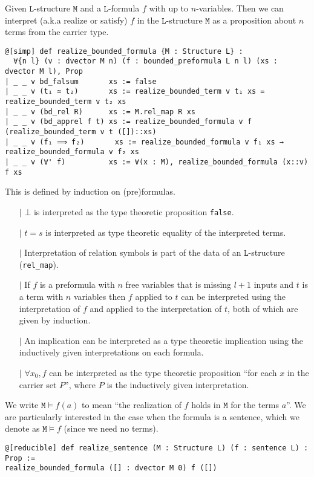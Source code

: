 \begin{dfn}

    Given $\texttt{L}$-structure $\texttt{M}$ and a $\texttt{L}$-formula $f$ with up to $n$-variables.
    Then we can interpret (a.k.a realize or satisfy) $f$ in the $\texttt{L}$-structure $\texttt{M}$ as a
    proposition about $n$ terms from the carrier type.

    \begin{lstlisting}
@[simp] def realize_bounded_formula {M : Structure L} :
  ∀{n l} (v : dvector M n) (f : bounded_preformula L n l) (xs : dvector M l), Prop
| _ _ v bd_falsum       xs := false
| _ _ v (t₁ ≃ t₂)       xs := realize_bounded_term v t₁ xs = realize_bounded_term v t₂ xs
| _ _ v (bd_rel R)      xs := M.rel_map R xs
| _ _ v (bd_apprel f t) xs := realize_bounded_formula v f (realize_bounded_term v t ([])::xs)
| _ _ v (f₁ ⟹ f₂)       xs := realize_bounded_formula v f₁ xs → realize_bounded_formula v f₂ xs
| _ _ v (∀' f)          xs := ∀(x : M), realize_bounded_formula (x::v) f xs \end{lstlisting}

  This is defined by induction on (pre)formulas.
  \begin{itemize}
    \item[$\vert$] $\bot$ is interpreted as the type theoretic proposition \texttt{false}.
    \item[$\vert$] $t = s$ is interpreted as type theoretic equality of the interpreted terms.
    \item[$\vert$] Interpretation of relation symbols is part of the data of an
          $\texttt{L}$-structure (\texttt{rel\_map}).
    \item[$\vert$] If $f$ is a preformula with $n$ free variables that is missing
          $l + 1$ inputs and $t$ is a term with $n$ variables
          then $f$ applied to $t$ can be interpreted using the interpretation of $f$ and
          applied to the interpretation of $t$, both of which are given by induction.
    \item[$\vert$] An implication can be interpreted as a type theoretic implication
          using the inductively given interpretations on each formula.
    \item[$\vert$] $\forall x_{0}, f$ can be interpreted as the type theoretic proposition
          ``for each $x$ in the carrier set $P$'',
          where $P$ is the inductively given interpretation.
  \end{itemize}

  We write $\texttt{M} \models f(a)$ to mean ``the realization of $f$ holds in $\texttt{M}$ for the terms $a$''.
  We are particularly interested in the case when the formula is a sentence,
  which we denote as $\texttt{M} \vDash f$ (since we need no terms).
  \begin{lstlisting}
@[reducible] def realize_sentence (M : Structure L) (f : sentence L) : Prop :=
realize_bounded_formula ([] : dvector M 0) f ([])\end{lstlisting}
\end{dfn}


